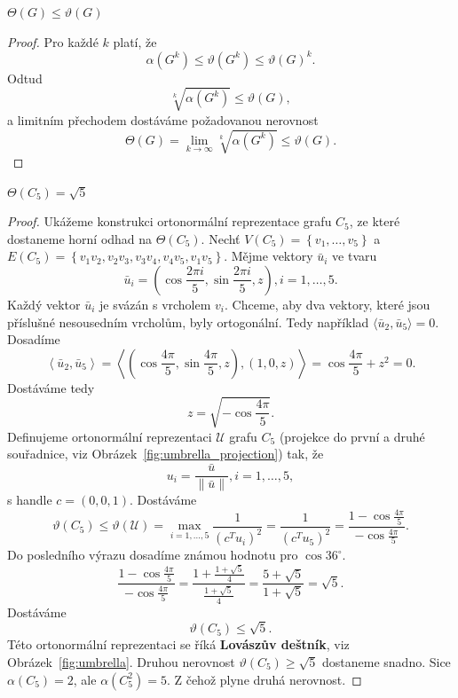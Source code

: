 \begin{lm}
    $\Theta(G) \leq \vartheta(G)$
\end{lm}

\begin{proof}
    Pro každé $k$ platí, že
    $$
        \alpha(G^k) \leq \vartheta(G^k) \leq \vartheta(G)^k.
    $$
    Odtud
    $$
        \sqrt[k]{\alpha(G^k)} \leq \vartheta(G),
    $$
    a limitním přechodem dostáváme požadovanou nerovnost
    $$
        \Theta(G) = \lim_{k \to \infty} \sqrt[k]{\alpha(G^k)} \leq \vartheta(G).
    $$
\end{proof}

\begin{vt}
    $\Theta(C_5) = \sqrt{5}$
\end{vt}

\begin{proof}
    Ukážeme konstrukci ortonormální reprezentace grafu $C_5$, ze které dostaneme horní odhad na $\Theta(C_5)$. Nechť $V(C_5) = \left\{ v_1, \dots, v_5 \right\}$ a $E(C_5) = \left\{ v_1v_2, v_2v_3, v_3v_4, v_4v_5, v_1v_5 \right\}$. Mějme vektory $\bar{u}_i$ ve tvaru
    $$
        \bar{u}_i = \left( \cos\frac{2 \pi i}{5}, \sin \frac{2 \pi i}{5}, z \right), i = 1, \dots, 5.
    $$
    Každý vektor $\bar{u}_i$ je svázán s vrcholem $v_i$. Chceme, aby dva vektory, které jsou příslušné nesousedním vrcholům, byly ortogonální. Tedy například $\langle \bar{u}_2, \bar{u}_5 \rangle = 0$. Dosadíme
    $$
        \left\langle \bar{u}_2, \bar{u}_5 \right\rangle = 
        \left\langle ( \cos\frac{4\pi}{5}, \sin\frac{4\pi}{5}, z ), \left( 1, 0, z \right) \right\rangle =
        \cos\frac{4\pi}{5} + z^2 = 0.
    $$
    Dostáváme tedy
    $$
        z = \sqrt{-\cos\frac{4\pi}{5}}.
    $$
    Definujeme ortonormální reprezentaci $\mathcal{U}$ grafu $C_5$ (projekce do první a druhé souřadnice, viz Obrázek~\ref{fig:umbrella_projection}) tak, že
    $$
        u_i = \frac{\bar{u}}{\| \bar{u} \|}, i = 1, \dots, 5,
    $$
    s handle $c = \left( 0, 0, 1 \right)$.
    Dostáváme
    $$
        \vartheta(C_5) \leq \vartheta(\mathcal{U}) = \max_{i = 1, \dots, 5} \frac{1}{(c^T u_i)^2} = \frac{1}{( c^T u_5)^2} = \frac{1 - \cos\frac{4\pi}{5}}{-\cos\frac{4\pi}{5}}.
    $$
    Do posledního výrazu dosadíme známou hodnotu pro $\cos 36^{\circ}$.
    $$
        \frac{1 - \cos\frac{4\pi}{5}}{-\cos\frac{4\pi}{5}} = \frac{1 + \frac{1 + \sqrt{5}}{4}}{\frac{1 + \sqrt{5}}{4}} = \frac{5 + \sqrt{5}}{1 + \sqrt{5}} = \sqrt{5}.
    $$
    Dostáváme
    $$
        \vartheta(C_5) \leq \sqrt{5}.
    $$
    Této ortonormální reprezentaci se říká \textbf{Lovászův deštník}, viz Obrázek~\ref{fig:umbrella}. Druhou nerovnost $\vartheta(C_5) \geq \sqrt{5}$ dostaneme snadno. Sice $\alpha(C_5) = 2$, ale $\alpha(C_5^2) = 5$. Z čehož plyne druhá nerovnost.
\end{proof}

